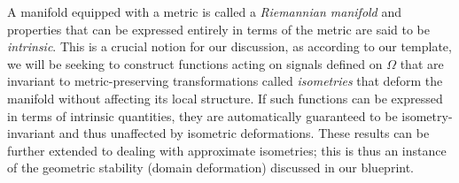 A manifold equipped with a metric is called a
{\em Riemannian manifold} and properties that can be expressed entirely in terms of the metric are said to be {\em intrinsic}. %
This is a crucial notion for our discussion, as according to our template, we will be seeking to construct functions acting on signals defined on $\Omega$ that are invariant to metric-preserving transformations called {\em isometries} that deform the manifold without affecting its local structure.  If such functions can be expressed in terms of intrinsic quantities, they are automatically guaranteed to be isometry-invariant and thus unaffected by isometric deformations. 
%
These results can be further extended to dealing with approximate isometries; this is thus an instance of the geometric stability (domain deformation) discussed in our blueprint. 



